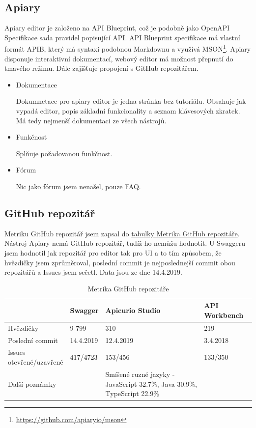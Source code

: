 \documentclass[thesis=B,czech]{FITthesis}[2012/06/26]
\begin{document}
        \subsection{Apiary}
            Apiary \cite{apiary} editor je založeno na API Blueprint, což je podobně jako OpenAPI Specifikace sada pravidel popisující API. API Blueprint specifikace má vlastní formát APIB, který má syntaxi podobnou Markdownu a využívá MSON\footnote{\url{https://github.com/apiaryio/mson}}.
            Apiary disponuje interaktivní dokumentací, webový editor má možnost přepnutí do tmavého režimu. Dále zajišťuje propojení s GitHub repozitářem.
            \begin{itemize}
                \item Dokumentace
                
                    Dokumnetace pro apiary editor je jedna stránka bez tutoriálu. Obsahuje jak vypadá editor, popis základní funkcionality a seznam klávesových zkratek. Má tedy nejmenší dokumentaci ze všech nástrojů.
                \item Funkčnost
                
                    Splňuje požadovanou funkčnost.
                \item Fórum
                
                    Nic jako fórum jsem nenašel, pouze FAQ.
            \end{itemize}
        \subsection{GitHub repozitář}
            Metriku GitHub repozitář jsem zapsal do \hyperref[tab:tabulkaPokryti]{tabulky Metrika GitHub repozitáře}.
            Nástroj Apiary nemá GitHub repozitář, tudíž ho nemůžu hodnotit. U Swaggeru jsem hodnotil jak repozitář pro editor tak pro UI a to tím způsobem, že hvězdičky jsem zprůměroval, poslední commit je nejposlednejší commit obou repozitářů a Issues jsem sečetl. Data jsou ze dne 14.4.2019.
            \begin{table}[h!]
            	\caption{Metrika GitHub repozitáře \cite{githubSwaggerUI, githubSwaggerEditor, githubApicur, githubApiworkbench}} \label{tabulkaMatrikyGitHub}
            	\begin{tabular}{| p{3cm} | p{2cm} | p{5cm} | p{2cm} |}  \hline
            		 & Swagger & Apicurio Studio & API Workbench
            		\tabularnewline \hline \hline
                    Hvězdičky & 9 799 & 310 & 219
                	\tabularnewline \hline
                    Poslední commit & 14.4.2019 & 12.4.2019 & 3.4.2018
                	\tabularnewline \hline
                    \parbox[t]{3cm}{Issues \\otevřené/uzavřené} & 417/4723 & 153/456 & 133/350
                	\tabularnewline \hline
                    Další poznámky & & Smíšené ruzné jazyky - JavaScript 32.7\%, Java 30.9\%, TypeScript 22.9\% &
                	\tabularnewline \hline
                \end{tabular}
            \end{table}
\end{document}
